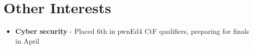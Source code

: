 \documentclass[a4paper,11pt]{article}
\newcommand{\resumeItem}[1]{
  \item\small{#1}
}
\newcommand{\resumeItemListStart}{\begin{itemize}[rightmargin=0.11in]}
\newcommand{\resumeItemListEnd}{\end{itemize}}
\begin{document}

\section{Other Interests}
  \resumeItemListStart{}
    \resumeItem{\textbf{Cyber security} - Placed 6th in pwnEd4 CtF qualifiers, preparing for finals in April}
  \resumeItemListEnd{}
\end{document}
